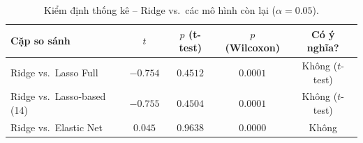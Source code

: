 \documentclass[12pt,a4paper]{article}
\begin{document}
\begin{table}[H]
  \centering
  \caption{10-Fold CV (mean $\pm$ std) -- các mô hình Regularization.}
  \label{tab:reg_cv}
\end{table}

\begin{table}[H]
  \centering
  \caption{Kiểm định thống kê -- Ridge vs.\ các mô hình còn lại ($\alpha=0.05$).}
  \label{tab:reg_stat}
  \begin{tabular}{lcccc}
    \toprule
    \textbf{Cặp so sánh} & $t$ & $p$ (t-test) & $p$ (Wilcoxon)
      & \textbf{Có ý nghĩa?} \\
    \midrule
    Ridge vs.\ Lasso Full
      & $-0.754$ & $0.4512$ & $0.0001$ & Không ($t$-test) \\
    Ridge vs.\ Lasso-based (14)
      & $-0.755$ & $0.4504$ & $0.0001$ & Không ($t$-test) \\
    Ridge vs.\ Elastic Net
      & $0.045$  & $0.9638$ & $0.0000$ & Không \\
    \bottomrule
  \end{tabular}
\end{table}
\end{document}
